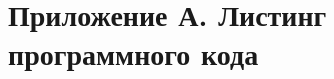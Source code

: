 \section*{Приложение А. Листинг программного кода}


\newpage


\newpage


\newpage


\newpage


\newpage


\newpage


\newpage


\newpage

